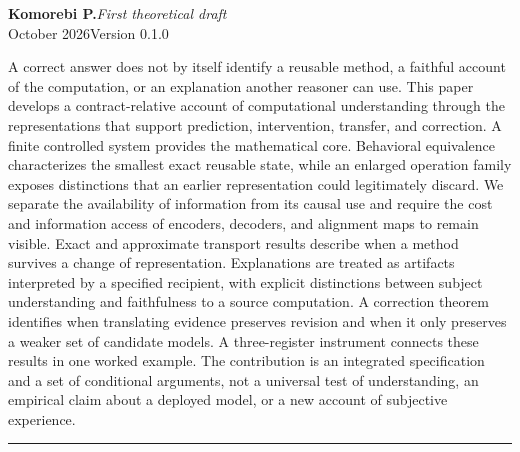 \documentclass[11pt,letterpaper]{article}
\theoremstyle{plain}
\theoremstyle{definition}
\begin{document}
\hypersetup{pageanchor=false}
\begin{titlepage}
\thispagestyle{empty}
\vspace*{.25in}
\par
\vspace{.65in}
\vspace{.19in}
\vspace{.28in}
\noindent{\color{ink}\rule{\textwidth}{.85pt}}\par
\vspace{.16in}
\noindent\textbf{Komorebi P.}\hfill\textit{First theoretical draft}\\
 October 2026\hfill Version 0.1.0\par
\vspace{.46in}
\par\smallskip
\noindent A correct answer does not by itself identify a reusable method, a faithful account of the computation, or an explanation another reasoner can use. This paper develops a contract-relative account of computational understanding through the representations that support prediction, intervention, transfer, and correction. A finite controlled system provides the mathematical core. Behavioral equivalence characterizes the smallest exact reusable state, while an enlarged operation family exposes distinctions that an earlier representation could legitimately discard. We separate the availability of information from its causal use and require the cost and information access of encoders, decoders, and alignment maps to remain visible. Exact and approximate transport results describe when a method survives a change of representation. Explanations are treated as artifacts interpreted by a specified recipient, with explicit distinctions between subject understanding and faithfulness to a source computation. A correction theorem identifies when translating evidence preserves revision and when it only preserves a weaker set of candidate models. A three-register instrument connects these results in one worked example. The contribution is an integrated specification and a set of conditional arguments, not a universal test of understanding, an empirical claim about a deployed model, or a new account of subjective experience.
\vfill
\noindent\rule{\textwidth}{.4pt}\par\smallskip
{}
\end{titlepage}
\hypersetup{pageanchor=true}
\begingroup\small\setlength{\parskip}{0pt}\tableofcontents\endgroup
\clearpage
\end{document}
